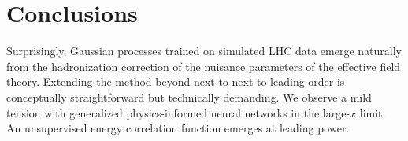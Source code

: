 \section{Conclusions}\label{sec:conclusions}

Surprisingly, Gaussian processes trained on simulated LHC data emerge
naturally from the hadronization correction of the nuisance parameters
of the effective field theory. Extending the method beyond
next-to-next-to-leading order is conceptually straightforward but
technically demanding. We observe a mild tension with generalized
physics-informed neural networks in the large-$x$ limit. An unsupervised
energy correlation function emerges at leading power.

